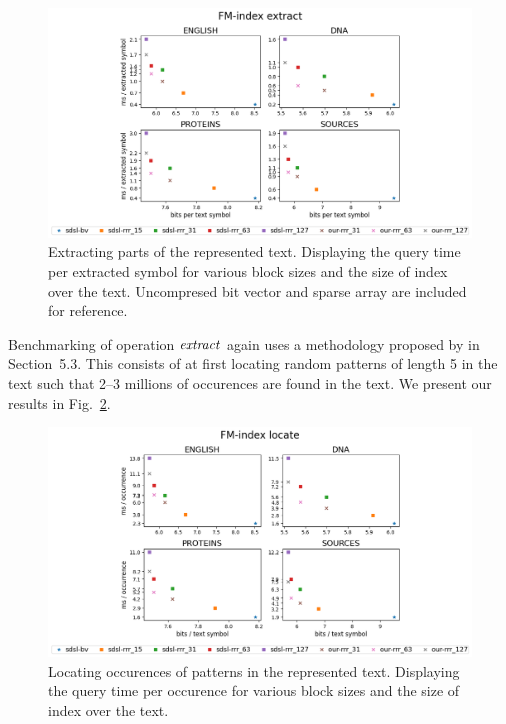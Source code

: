 \begin{figure}
	\centerline{
		\includegraphics[width=\textwidth, height=0.4\textheight]{images/vysledky_sdsl_extract}
	}
	\caption[TODO]{Extracting parts of the represented text. Displaying
	the query time per extracted symbol for various block sizes and the size of index over the
	text. Uncompresed bit vector and sparse array are included for reference. 
	}
	\label{obr:benchmark_sdsl_extract}
\end{figure}

Benchmarking of operation $\mathit{extract}$ again uses a methodology proposed by \cite{ferragina2009compressed} 
in Section~5.3. This consists of at first locating random patterns of length 5 in the text such
that 2--3 millions of occurences are found in the text. We present our results in Fig.~\ref{obr:benchmark_sdsl_locate}.

\begin{figure}
	\centerline{
		\includegraphics[width=\textwidth, height=0.4\textheight]{images/vysledky_sdsl_locate}
	}
	\caption[TODO]{Locating occurences of patterns in the represented text. Displaying
	the query time per occurence for various block sizes and the size of index over the
	text.
	}
	\label{obr:benchmark_sdsl_locate}
\end{figure}

